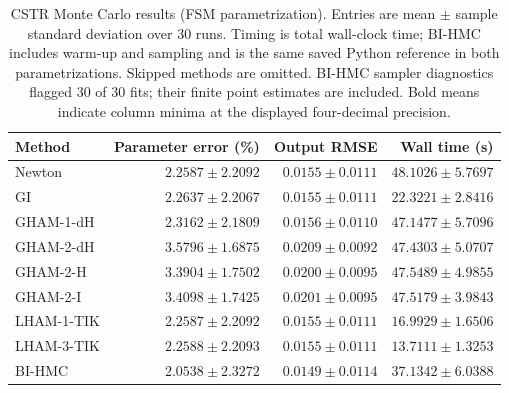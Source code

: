 \begin{table}[tbp]
\centering
\small
\setlength{\tabcolsep}{4pt}
\caption{CSTR Monte Carlo results (FSM parametrization). Entries are mean $\pm$ sample standard deviation over 30 runs. Timing is total wall-clock time; BI-HMC includes warm-up and sampling and is the same saved Python reference in both parametrizations. Skipped methods are omitted. BI-HMC sampler diagnostics flagged 30 of 30 fits; their finite point estimates are included. Bold means indicate column minima at the displayed four-decimal precision.}
\label{tab:cstr-montecarlo-fsm}
\begin{tabular}{lrrr}
\toprule
Method & Parameter error (\%) & Output RMSE & Wall time (s) \\
\midrule
Newton & $2.2587 \pm 2.2092$ & $0.0155 \pm 0.0111$ & $48.1026 \pm 5.7697$ \\
GI & $2.2637 \pm 2.2067$ & $0.0155 \pm 0.0111$ & $22.3221 \pm 2.8416$ \\
GHAM-1-dH & $2.3162 \pm 2.1809$ & $0.0156 \pm 0.0110$ & $47.1477 \pm 5.7096$ \\
GHAM-2-dH & $3.5796 \pm 1.6875$ & $0.0209 \pm 0.0092$ & $47.4303 \pm 5.0707$ \\
GHAM-2-H & $3.3904 \pm 1.7502$ & $0.0200 \pm 0.0095$ & $47.5489 \pm 4.9855$ \\
GHAM-2-I & $3.4098 \pm 1.7425$ & $0.0201 \pm 0.0095$ & $47.5179 \pm 3.9843$ \\
LHAM-1-TIK & $2.2587 \pm 2.2092$ & $0.0155 \pm 0.0111$ & $16.9929 \pm 1.6506$ \\
LHAM-3-TIK & $2.2588 \pm 2.2093$ & $0.0155 \pm 0.0111$ & $\mathbf{13.7111} \pm 1.3253$ \\
BI-HMC & $\mathbf{2.0538} \pm 2.3272$ & $\mathbf{0.0149} \pm 0.0114$ & $37.1342 \pm 6.0388$ \\
\bottomrule
\end{tabular}
\end{table}
